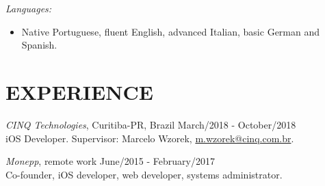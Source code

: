 \documentclass[margin]{res}
\begin{document}
\begin{resume}
			{\sl Languages:}
			\begin{itemize}
				\item[] Native Portuguese, fluent English, advanced Italian, basic German and Spanish.
			\end{itemize}

 		\section{EXPERIENCE}
 			{\sl CINQ Technologies}, Curitiba-PR, Brazil \hfill March/2018 - October/2018 \\
 			iOS Developer.
			Supervisor: Marcelo Wzorek, \href{mailto:m.wzorek@cinq.com.br}{m.wzorek@cinq.com.br}.

 			{\sl Monepp}, remote work \hfill June/2015 - February/2017 \\
			Co-founder, iOS developer, web developer, systems administrator.
 			 		

\end{resume}
\end{document}

